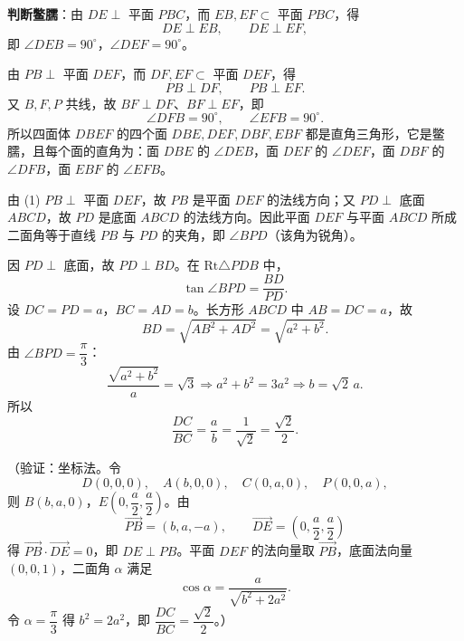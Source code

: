 \begin{answer}
\textbf{判断鳖臑}：由 \(DE\perp\) 平面 \(PBC\)，而 \(EB,EF\subset\) 平面 \(PBC\)，得
\nopagebreak[4]
\[
DE\perp EB,\qquad DE\perp EF,
\]
即 \(\angle DEB=90^\circ\)，\(\angle DEF=90^\circ\)。

由 \(PB\perp\) 平面 \(DEF\)，而 \(DF,EF\subset\) 平面 \(DEF\)，得
\nopagebreak[4]
\[
PB\perp DF,\qquad PB\perp EF.
\]
又 \(B,F,P\) 共线，故 \(BF\perp DF\)、\(BF\perp EF\)，即
\nopagebreak[4]
\[
\angle DFB=90^\circ,\qquad \angle EFB=90^\circ.
\]
所以四面体 \(DBEF\) 的四个面 \(DBE,DEF,DBF,EBF\) 都是直角三角形，它是鳖臑，且每个面的直角为：面 \(DBE\) 的 \(\angle DEB\)，面 \(DEF\) 的 \(\angle DEF\)，面 \(DBF\) 的 \(\angle DFB\)，面 \(EBF\) 的 \(\angle EFB\)。


由 (1) \(PB\perp\) 平面 \(DEF\)，故 \(PB\) 是平面 \(DEF\) 的法线方向；又 \(PD\perp\) 底面 \(ABCD\)，故 \(PD\) 是底面 \(ABCD\) 的法线方向。因此平面 \(DEF\) 与平面 \(ABCD\) 所成二面角等于直线 \(PB\) 与 \(PD\) 的夹角，即 \(\angle BPD\)（该角为锐角）。

因 \(PD\perp\) 底面，故 \(PD\perp BD\)。在 \(\mathrm{Rt}\triangle PDB\) 中，
\nopagebreak[4]
\[
\tan\angle BPD=\dfrac{BD}{PD}.
\]
设 \(DC=PD=a\)，\(BC=AD=b\)。长方形 \(ABCD\) 中 \(AB=DC=a\)，故
\nopagebreak[4]
\[
BD=\sqrt{AB^2+AD^2}=\sqrt{a^2+b^2}.
\]
由 \(\angle BPD=\dfrac{\pi}{3}\)：
\nopagebreak[4]
\[
\dfrac{\sqrt{a^2+b^2}}{a}=\sqrt3
\Longrightarrow
a^2+b^2=3a^2
\Longrightarrow
b=\sqrt2\,a.
\]
所以
\nopagebreak[4]
\[
\dfrac{DC}{BC}=\dfrac{a}{b}=\dfrac{1}{\sqrt2}=\dfrac{\sqrt2}{2}.
\]

（验证：坐标法。令
\nopagebreak[4]
\[
D(0,0,0),\quad A(b,0,0),\quad C(0,a,0),\quad P(0,0,a),
\]
则 \(B(b,a,0)\)，\(E\left(0,\dfrac a2,\dfrac a2\right)\)。由
\nopagebreak[4]
\[
\overrightarrow{PB}=(b,a,-a),\qquad
\overrightarrow{DE}=\left(0,\dfrac a2,\dfrac a2\right)
\]
得 \(\overrightarrow{PB}\cdot\overrightarrow{DE}=0\)，即 \(DE\perp PB\)。平面 \(DEF\) 的法向量取 \(\overrightarrow{PB}\)，底面法向量 \((0,0,1)\)，二面角 \(\alpha\) 满足
\nopagebreak[4]
\[
\cos\alpha=\dfrac{a}{\sqrt{b^2+2a^2}}.
\]
令 \(\alpha=\dfrac{\pi}{3}\) 得 \(b^2=2a^2\)，即 \(\dfrac{DC}{BC}=\dfrac{\sqrt2}{2}\)。）



\end{answer}

